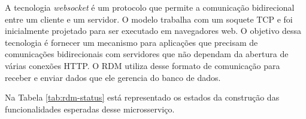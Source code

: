 A tecnologia \textit{websocket} é um protocolo que permite a comunicação bidirecional entre um cliente e um servidor. O modelo trabalha com um soquete TCP e foi inicialmente projetado para ser executado em navegadores web. O objetivo dessa tecnologia é fornecer um mecanismo para aplicações que precisam de comunicações bidirecionais com servidores que não dependam da abertura de várias conexões HTTP. O RDM utiliza desse formato de comunicação para receber e enviar dados que ele gerencia do banco de dados.

Na Tabela \ref{tab:rdm-status} está representado os estados da construção das funcionalidades esperadas desse microsserviço.

\begin{table}[!h]
\centering
\caption{Tabela de funcionalidades e estado da construção do serviço do \textit{Rethink Data Manager}.}
\label{tab:rdm-status}
\end{table}

